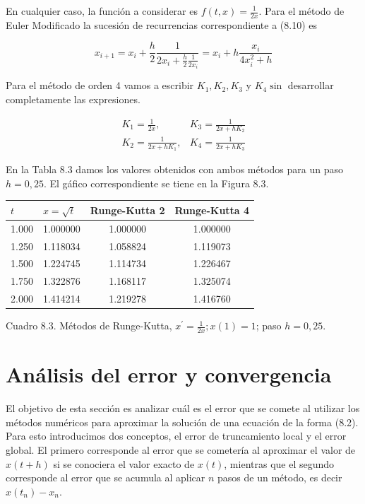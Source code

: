 \documentclass[10pt]{book}
\begin{document}
En cualquier caso, la función a considerar es $f(t, x)=\frac{1}{2 x}$. Para el método de Euler Modificado la sucesión de recurrencias correspondiente a (8.10) es

$$
x_{i+1}=x_{i}+\frac{h}{2} \frac{1}{2 x_{i}+\frac{h}{2} \frac{1}{2 x_{i}}}=x_{i}+h \frac{x_{i}}{4 x_{i}^{2}+h}
$$

Para el método de orden 4 vamos a escribir $K_{1}, K_{2}, K_{3}$ y $K_{4} \sin$ desarrollar completamente las expresiones.

$$
\begin{array}{ll}
K_{1}=\frac{1}{2 x}, & K_{3}=\frac{1}{2 x+h K_{2}} \\
K_{2}=\frac{1}{2 x+h K_{1}}, & K_{4}=\frac{1}{2 x+h K_{3}}
\end{array}
$$

En la Tabla 8.3 damos los valores obtenidos con ambos métodos para un paso $h=0,25$. El gáfico correspondiente se tiene en la Figura 8.3.

\begin{center}
\begin{tabular}{|l|l|c|c|}
\hline
$t$ & $x=\sqrt{t}$ & Runge-Kutta 2 & Runge-Kutta 4 \\
\hline
1.000 & 1.000000 & 1.000000 & 1.000000 \\
1.250 & 1.118034 & 1.058824 & 1.119073 \\
1.500 & 1.224745 & 1.114734 & 1.226467 \\
1.750 & 1.322876 & 1.168117 & 1.325074 \\
2.000 & 1.414214 & 1.219278 & 1.416760 \\
\hline
\end{tabular}
\end{center}

Cuadro 8.3. Métodos de Runge-Kutta, $x^{\prime}=\frac{1}{2 x} ; x(1)=1$; paso $h=0,25$.

\section{Análisis del error y convergencia}
El objetivo de esta sección es analizar cuál es el error que se comete al utilizar los métodos numéricos para aproximar la solución de una ecuación de la forma (8.2). Para esto introducimos dos conceptos, el error de truncamiento local y el error global. El primero corresponde al error que se cometería al aproximar el valor de $x(t+h)$ si se conociera el valor exacto de $x(t)$, mientras que el segundo corresponde al error que se acumula al aplicar $n$ pasos de un método, es decir $x\left(t_{n}\right)-x_{n}$.
\end{document}
